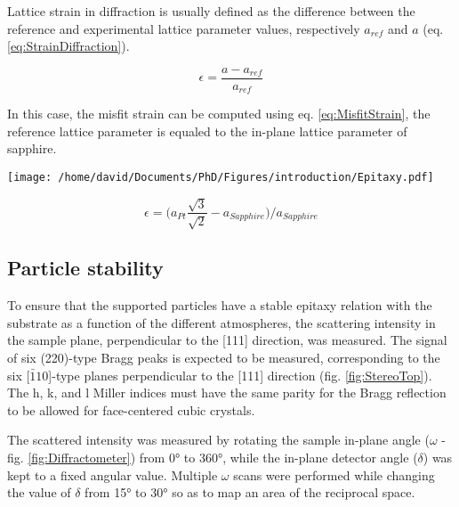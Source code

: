 Lattice strain in diffraction is usually defined as the difference between the reference and experimental lattice parameter values, respectively $a_{ref}$ and $a$ (eq. \ref{eq:StrainDiffraction}).

\begin{equation}
    \epsilon = \frac{a - a_{ref}}{a_{ref}}
    \label{eq:StrainDiffraction}
\end{equation}

In this case, the misfit strain can be computed using eq. \ref{eq:MisfitStrain}, the reference lattice parameter is equaled to the in-plane lattice parameter of sapphire.

\begin{minipage}{0.55\linewidth}
    \centering
    \texttt{[image: /home/david/Documents/PhD/Figures/introduction/Epitaxy.pdf]}
    \label{fig:Epitaxy}
\end{minipage}%
\hfill%
\begin{minipage}{0.44\linewidth}
    \begin{equation}
        \epsilon = \big( a_{Pt} \frac{\sqrt{3}}{\sqrt{2}} - a_{Sapphire} \big) / a_{Sapphire}
        \label{eq:MisfitStrain}
    \end{equation}
\end{minipage}%

\subsection{Particle stability}

To ensure that the  supported particles have a stable epitaxy relation with the substrate as a function of the different atmospheres, the scattering intensity in the sample plane, perpendicular to the [111] direction, was measured.
The signal of six (220)-type Bragg peaks is expected to be measured, corresponding to the six [$\bar{1}10$]-type planes perpendicular to the [111] direction (fig. \ref{fig:StereoTop}).
The h, k, and l Miller indices must have the same parity for the Bragg reflection to be allowed for face-centered cubic crystals.

The scattered intensity was measured by rotating the sample in-plane angle ($\omega$ - fig. \ref{fig:Diffractometer}) from \ang{0} to \ang{360}, while the in-plane detector angle ($\delta$) was kept to a fixed angular value.
Multiple $\omega$ scans were performed while changing the value of $\delta$ from \ang{15} to \ang{30} so as to map an area of the reciprocal space.

